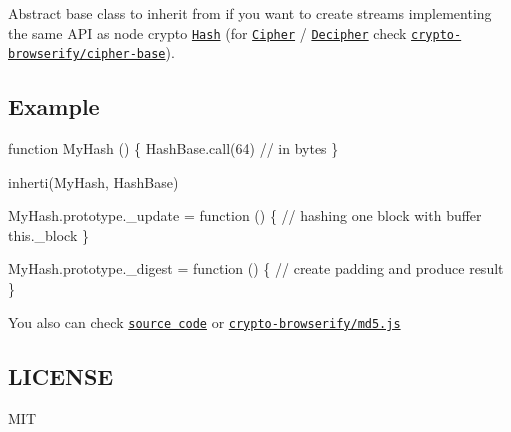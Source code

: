 \href{https://www.npmjs.org/package/hash-base}{\tt } \href{https://travis-ci.org/crypto-browserify/hash-base}{\tt } \href{https://david-dm.org/crypto-browserify/hash-base#info=dependencies}{\tt }

\href{https://github.com/feross/standard}{\tt }

Abstract base class to inherit from if you want to create streams implementing the same A\+PI as node crypto \href{https://nodejs.org/api/crypto.html#crypto_class_hash}{\tt Hash} (for \href{https://nodejs.org/api/crypto.html#crypto_class_cipher}{\tt Cipher} / \href{https://nodejs.org/api/crypto.html#crypto_class_decipher}{\tt Decipher} check \href{https://github.com/crypto-browserify/cipher-base}{\tt crypto-\/browserify/cipher-\/base}).

\subsection*{Example}


\begin{DoxyCode}
function MyHash () \{
  HashBase.call(64) // in bytes
\}

inherti(MyHash, HashBase)

MyHash.prototype.\_update = function () \{
  // hashing one block with buffer this.\_block
\}

MyHash.prototype.\_digest = function () \{
  // create padding and produce result
\}
\end{DoxyCode}
 You also can check \href{index.js}{\tt source code} or \href{https://github.com/crypto-browserify/md5.js}{\tt crypto-\/browserify/md5.\+js}

\subsection*{L\+I\+C\+E\+N\+SE}

M\+IT 